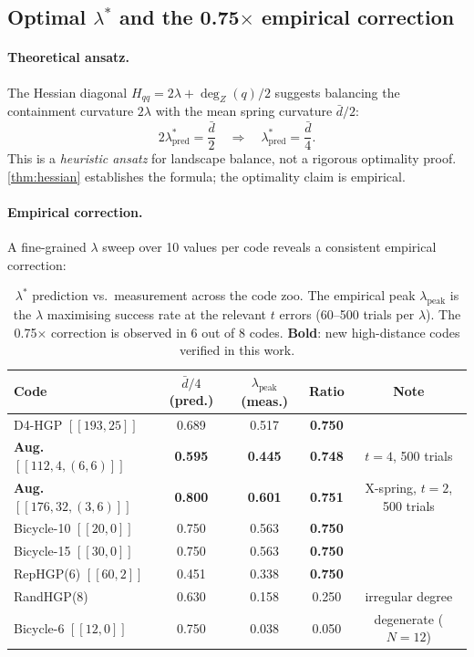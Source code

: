 \documentclass[12pt,a4paper]{article}
\theoremstyle{plain}
\theoremstyle{definition}
\theoremstyle{remark}
\newcommand{\dZ}{\operatorname{deg}_Z}
\begin{document}
\subsection{Optimal $\lambda^*$ and the 0.75$\times$ empirical correction}

\paragraph{Theoretical ansatz.}
The Hessian diagonal $H_{qq} = 2\lambda + \dZ(q)/2$ suggests balancing
the containment curvature $2\lambda$ with the mean spring curvature
$\bar{d}/2$:
\[
  2\lambda^*_{\mathrm{pred}} = \frac{\bar{d}}{2}
  \quad\Rightarrow\quad
  \lambda^*_{\mathrm{pred}} = \frac{\bar{d}}{4}.
\]
This is a \emph{heuristic ansatz} for landscape balance, not a rigorous
optimality proof.
\cref{thm:hessian} establishes the formula; the optimality claim is empirical.

\paragraph{Empirical correction.}
A fine-grained $\lambda$ sweep over 10 values per code reveals a consistent
empirical correction:

\begin{table}[ht]
\centering
\caption{$\lambda^*$ prediction vs.\ measurement across the code zoo.
  The empirical peak $\lambda_{\mathrm{peak}}$ is the $\lambda$ maximising
  success rate at the relevant $t$ errors (60--500 trials per $\lambda$).
  The 0.75$\times$ correction is observed in 6 out of 8 codes.
  \textbf{Bold}: new high-distance codes verified in this work.}
\label{tab:lambda_star}
\small
\begin{tabular}{lcccc}
\toprule
Code & $\bar{d}/4$ (pred.) & $\lambda_{\mathrm{peak}}$ (meas.) & Ratio & Note \\
\midrule
D4-HGP $[[193,25]]$ & 0.689 & 0.517 & \textbf{0.750} & \\
\textbf{Aug. $[[112,4,(6,6)]]$} & \textbf{0.595} & \textbf{0.445} & \textbf{0.748} & $t=4$, 500 trials \\
\textbf{Aug. $[[176,32,(3,6)]]$} & \textbf{0.800} & \textbf{0.601} & \textbf{0.751} & X-spring, $t=2$, 500 trials \\
Bicycle-10 $[[20,0]]$ & 0.750 & 0.563 & \textbf{0.750} & \\
Bicycle-15 $[[30,0]]$ & 0.750 & 0.563 & \textbf{0.750} & \\
RepHGP(6) $[[60,2]]$ & 0.451 & 0.338 & \textbf{0.750} & \\
RandHGP(8) & 0.630 & 0.158 & 0.250 & irregular degree \\
Bicycle-6 $[[12,0]]$ & 0.750 & 0.038 & 0.050 & degenerate ($N=12$) \\
\bottomrule
\end{tabular}
\end{table}
\end{document}
